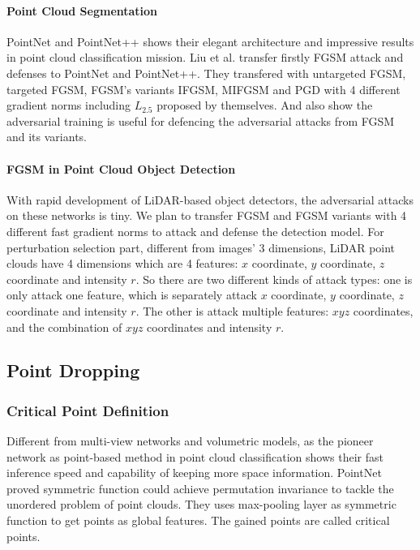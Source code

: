 \paragraph{Point Cloud Segmentation}
PointNet and PointNet++ shows their elegant architecture and impressive results in point cloud classification mission. Liu et al.\cite{liu_extending_2019} transfer firstly FGSM attack and defenses to PointNet and PointNet++. They transfered with untargeted FGSM, targeted FGSM, FGSM's variants IFGSM, MIFGSM and PGD with 4 different gradient norms including \(L_{2.5}\) proposed by themselves. And also show the adversarial training is useful for defencing the adversarial attacks from FGSM and its variants.
\paragraph{FGSM in Point Cloud Object Detection}
With rapid development of LiDAR-based object detectors, the adversarial attacks on these networks is tiny. We plan to transfer FGSM and FGSM variants with 4 different fast gradient norms to attack and defense the detection model.
For perturbation selection part, different from images' 3 dimensions, LiDAR point clouds have 4 dimensions which are 4 features: \(x\) coordinate, \(y\) coordinate, \(z\) coordinate and intensity \(r\). So there are two different kinds of attack types: one is only attack one feature, which is separately attack \(x\) coordinate, \(y\) coordinate, \(z\) coordinate and intensity \(r\). The other is attack multiple features: \(xyz\) coordinates, and the combination of \(xyz\) coordinates and intensity \(r\). 


\subsection{Point Dropping}

\subsubsection{Critical Point Definition}

Different from multi-view networks and volumetric models, as the pioneer network as point-based method in point cloud classification shows their fast inference speed and capability of keeping more space information. PointNet\cite{qi_pointnet_2017} proved symmetric function could achieve permutation invariance to tackle the unordered problem of point clouds. They uses max-pooling layer as symmetric function to get points as global features. The gained points are called critical points.

